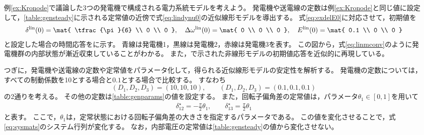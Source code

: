 \documentclass[tombow,dvipdfmx]{corona-a5-1.1}
\begin{document}
\begin{例}[近似線形モデルの数値的な安定性解析]\label{ex:linsyssim}
例\ref{ex:Kronode}で議論した3つの発電機で構成される電力系統モデルを考えよう。
発電機や送電線の定数は例\ref{ex:Kronode}と同じ値に設定して，\ref{table:gensteady}に示される定常値の近傍で式\ref{eq:lindynu0}の近似線形モデルを導出する。
式\ref{eq:exdelE0}に対応させて，初期値を
\begin{align}\label{eq:linmini}
\delta^{\rm lin}(0)
 =
\mat{
\tfrac{\pi}{6} \\
0 \\
0
},\quad
\Delta \omega^{\rm lin}(0)
 =
\mat{
0 \\
0 \\
0
},\quad
E^{\rm lin}(0)
 =
\mat{
0.1 \\
0 \\
0
}
\end{align}
と設定した場合の時間応答をに示す。
青線は発電機1，黒線は発電機2，赤線は発電機3を表す。
この図から，式\ref{eq:linmconv}のように発電機群の内部状態が漸近収束していることがわかる。
また，で示された非線形モデルの初期値応答を近似的に再現している。


つぎに，発電機や送電線の定数や定常値をパラメータ化して，得られる近似線形モデルの安定性を解析する。
発電機の定数については，すべての制動係数を10とする場合と$0.1$とする場合で比較する。
すなわち
\[
(D_1,D_2,D_3)= (10,10,10), \qquad
(D_1,D_2,D_3)= \left(0.1,0.1,0.1\right)
\]
の2通りを考える。
その他の定数は\ref{table:genparams}の値を設定する。
また，回転子偏角差の定常値は，パラメータ$\theta_1 \in [0, 1]$を用いて
\begin{align}
\delta_{12}^{\star}= - \frac{\pi}{2} \theta_1
,\qquad
\delta_{13}^{\star}=  \frac{\pi}{2} \theta_1
\end{align}
と表す。
ここで，$\theta_1$は，定常状態における回転子偏角差の大きさを指定するパラメータである。
この値を変化させることで，式\ref{eq:sysmats}のシステム行列が変化する。
なお，内部電圧の定常値は\ref{table:gensteady}の値から変化させない。


\end{例}
\end{document}
